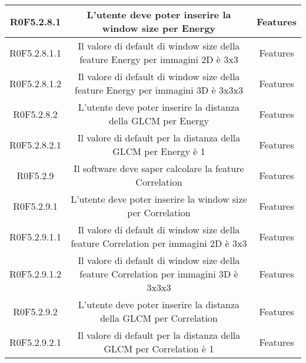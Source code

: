\begin{center}
\begin{longtable}{|c|c|c|}
\hline
R0F5.2.8.1   & \parbox[t]{\larghezza}{L'utente deve poter inserire la window size per Energy}  & \parbox[t]{\dimFonti}{ Features \\} \\
\hline
R0F5.2.8.1.1   & \parbox[t]{\larghezza}{Il valore di default di window size della feature Energy per immagini 2D è 3x3 }  & \parbox[t]{\dimFonti}{ Features \\} \\
\hline
R0F5.2.8.1.2   & \parbox[t]{\larghezza}{Il valore di default di window size della feature Energy per immagini 3D è 3x3x3}  & \parbox[t]{\dimFonti}{ Features \\} \\
\hline
R0F5.2.8.2   & \parbox[t]{\larghezza}{L'utente deve poter inserire la distanza della GLCM per Energy}  & \parbox[t]{\dimFonti}{ Features \\} \\
\hline
R0F5.2.8.2.1   & \parbox[t]{\larghezza}{Il valore di default per la distanza della GLCM per Energy è 1}  & \parbox[t]{\dimFonti}{ Features \\} \\
\hline
R0F5.2.9   & \parbox[t]{\larghezza}{Il software deve saper calcolare la feature Correlation}  & \parbox[t]{\dimFonti}{ Features \\} \\
\hline
R0F5.2.9.1   & \parbox[t]{\larghezza}{L'utente deve poter inserire la window size per Correlation}  & \parbox[t]{\dimFonti}{ Features \\} \\
\hline
R0F5.2.9.1.1   & \parbox[t]{\larghezza}{Il valore di default di window size della feature Correlation per immagini 2D è 3x3 }  & \parbox[t]{\dimFonti}{ Features \\} \\
\hline
R0F5.2.9.1.2   & \parbox[t]{\larghezza}{Il valore di default di window size della feature Correlation per immagini 3D è 3x3x3}  & \parbox[t]{\dimFonti}{ Features \\} \\
\hline
R0F5.2.9.2   & \parbox[t]{\larghezza}{L'utente deve poter inserire la distanza della GLCM per Correlation}  & \parbox[t]{\dimFonti}{ Features \\} \\
\hline
R0F5.2.9.2.1   & \parbox[t]{\larghezza}{Il valore di default per la distanza della GLCM per Correlation è 1}  & \parbox[t]{\dimFonti}{ Features \\} \\

\end{longtable}
\end{center}
